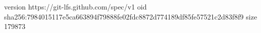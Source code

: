 version https://git-lfs.github.com/spec/v1
oid sha256:7984015117e5ca663894f79888fe02fdc8872d774189df85fe57521c2d83f8f9
size 179873
